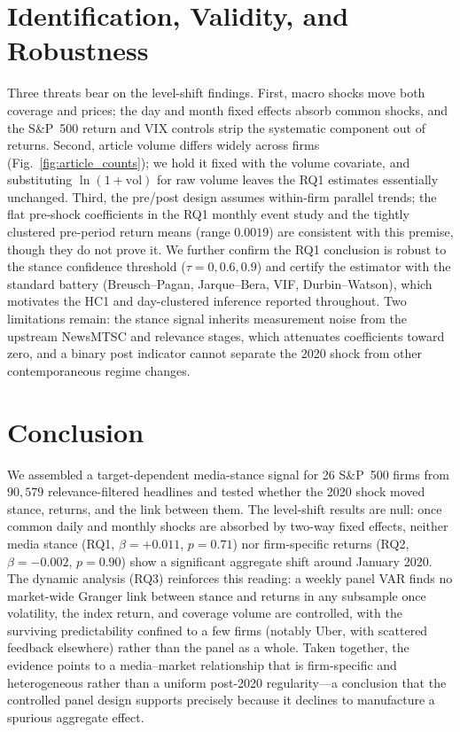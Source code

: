 \documentclass[conference]{IEEEtran}
\begin{document}
\section{Identification, Validity, and Robustness}
Three threats bear on the level-shift findings. First, macro shocks move both
coverage and prices; the day and month fixed effects absorb common shocks, and
the S\&P~500 return and VIX controls strip the systematic component out of
returns. Second, article volume differs widely across firms
(Fig.~\ref{fig:article_counts}); we hold it fixed with the volume covariate, and
substituting $\ln(1+\text{vol})$ for raw volume leaves the RQ1 estimates
essentially unchanged. Third, the pre/post design assumes within-firm parallel
trends; the flat pre-shock coefficients in the RQ1 monthly event study and the
tightly clustered pre-period return means (range $0.0019$) are consistent with
this premise, though they do not prove it. We further confirm the RQ1 conclusion
is robust to the stance confidence threshold ($\tau=0,0.6,0.9$) and certify the
estimator with the standard battery (Breusch--Pagan, Jarque--Bera, VIF,
Durbin--Watson), which motivates the HC1 and day-clustered inference reported
throughout. Two limitations remain: the stance signal inherits measurement noise
from the upstream NewsMTSC and relevance stages, which attenuates coefficients
toward zero, and a binary post indicator cannot separate the 2020 shock from
other contemporaneous regime changes.

\section{Conclusion}
We assembled a target-dependent media-stance signal for 26 S\&P~500 firms from
$90{,}579$ relevance-filtered headlines and tested whether the 2020 shock moved
stance, returns, and the link between them. The level-shift results are null:
once common daily and monthly shocks are absorbed by two-way fixed effects,
neither media stance (RQ1, $\beta=+0.011$, $p=0.71$) nor firm-specific
returns (RQ2, $\beta=-0.002$, $p=0.90$) show a significant aggregate shift around
January 2020. The dynamic analysis (RQ3) reinforces this reading: a weekly panel
VAR finds no market-wide Granger link between stance and returns in any subsample
once volatility, the index return, and coverage volume are controlled, with the
surviving predictability confined to a few firms (notably Uber, with scattered
feedback elsewhere) rather than the panel as a whole. Taken together, the evidence points to
a media--market relationship that is firm-specific and heterogeneous rather than
a uniform post-2020 regularity---a conclusion that the controlled panel design
supports precisely because it declines to manufacture a spurious aggregate
effect.
\end{document}
